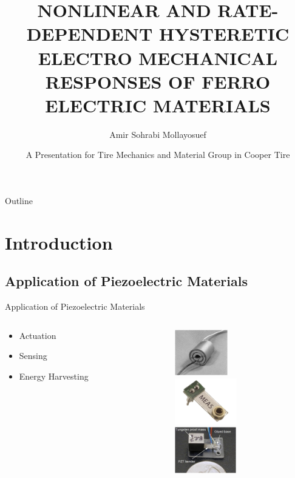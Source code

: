 \documentclass{beamer}
\title[Research Proposal] %
{NONLINEAR AND RATE-DEPENDENT HYSTERETIC ELECTRO MECHANICAL RESPONSES OF FERRO ELECTRIC MATERIALS}
\author [Sohrabi Mollayosuef, Amir] %
{Amir Sohrabi Mollayosuef}
\institute[Texas A\&M University] %
{ Department of Mechanical Engineering\\
  Texas A\&M University}
\date[16th December 2014] %
{A Presentation for Tire Mechanics and Material Group in Cooper Tire}
\begin{document}
\begin{frame}
  \titlepage
\end{frame}

\begin{frame}{Outline}
  \tableofcontents
\end{frame}

\section{Introduction} 

\subsection{Application of Piezoelectric Materials}

\begin{frame}{Application of Piezoelectric Materials}

     \begin{columns}[t] 
     \begin{column}[T]{5cm} 
       \begin{itemize} \itemsep8ex
  \item  Actuation \cite{Berner1999}
  \item  Sensing
   \item  Energy Harvesting \cite{roundy2004piezoelectric}
  \end{itemize} 
     \end{column}
     \begin{column}[T]{5cm} 
      \includegraphics[height=2cm]{../images/telescpic_actuator_picture}\\
      \includegraphics[height=2cm]{../images/piezeo_sensor}\\
      \includegraphics[height=2cm]{../images/piezeo_harvester}\\     
     \end{column}
     \end{columns}    
\end{frame}
\end{document}
